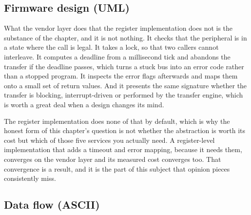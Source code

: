 \subsection*{Firmware design (UML)}


What the vendor layer does that the register implementation does not is the
substance of the chapter, and it is not nothing. It checks that the peripheral
is in a state where the call is legal. It takes a lock, so that two callers
cannot interleave. It computes a deadline from a millisecond tick and abandons
the transfer if the deadline passes, which turns a stuck bus into an error code
rather than a stopped program. It inspects the error flags afterwards and maps
them onto a small set of return values. And it presents the same signature
whether the transfer is blocking, interrupt-driven or performed by the transfer
engine, which is worth a great deal when a design changes its mind.

The register implementation does none of that by default, which is why the
honest form of this chapter's question is not whether the abstraction is worth
its cost but which of those five services you actually need. A register-level
implementation that adds a timeout and error mapping, because it needs them,
converges on the vendor layer and its measured cost converges too. That
convergence is a result, and it is the part of this subject that opinion pieces
consistently miss.

\subsection*{Data flow (ASCII)}

